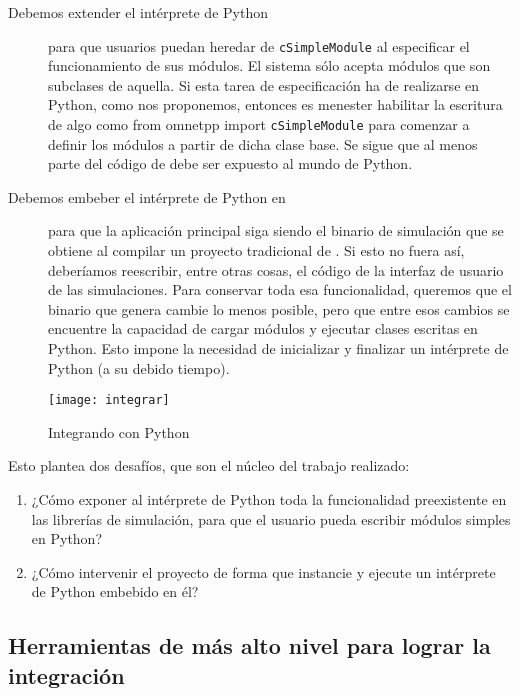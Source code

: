 \begin{description}
    \item[Debemos extender el intérprete de Python] para que usuarios puedan
heredar de \verb!cSimpleModule! al especificar el funcionamiento de sus
módulos. El sistema sólo acepta módulos que son subclases de aquella. Si esta
tarea de especificación ha de realizarse en Python, como nos proponemos,
entonces es menester habilitar la escritura de algo como from omnetpp import
\verb!cSimpleModule! para comenzar a definir los módulos a partir de dicha
clase base. Se sigue que al menos parte del código de \omnetpp{} debe ser
expuesto al mundo de Python.

    \item[Debemos embeber el intérprete de Python en \omnetpp{}] para que la
aplicación principal siga siendo el binario de simulación que se obtiene al
compilar un proyecto tradicional de \omnetpp{}. Si esto no fuera así,
deberíamos reescribir, entre otras cosas, el código de la interfaz de usuario
de las simulaciones.  Para conservar toda esa funcionalidad, queremos que el
binario que genera \omnetpp{} cambie lo menos posible, pero que entre esos
cambios se encuentre la capacidad de cargar módulos y ejecutar clases escritas
en Python. Esto impone la necesidad de inicializar y finalizar un intérprete de
Python (a su debido tiempo).
\end{description}

\begin{figure}[h]
\caption{Integrando \omnetpp{} con Python}
\label{fig:integrar}
\centering
\texttt{[image: integrar]}
\end{figure}

Esto plantea dos desafíos, que son el núcleo del trabajo realizado:

\begin{enumerate}
    \item ¿Cómo exponer al intérprete de Python toda la funcionalidad
preexistente en las librerías de simulación, para que el usuario pueda escribir
módulos simples en Python?
    \item ¿Cómo intervenir el proyecto \omnetpp{} de forma que instancie y
ejecute un intérprete de Python embebido en él?
\end{enumerate}

\subsection{Herramientas de más alto nivel para lograr la integración}

